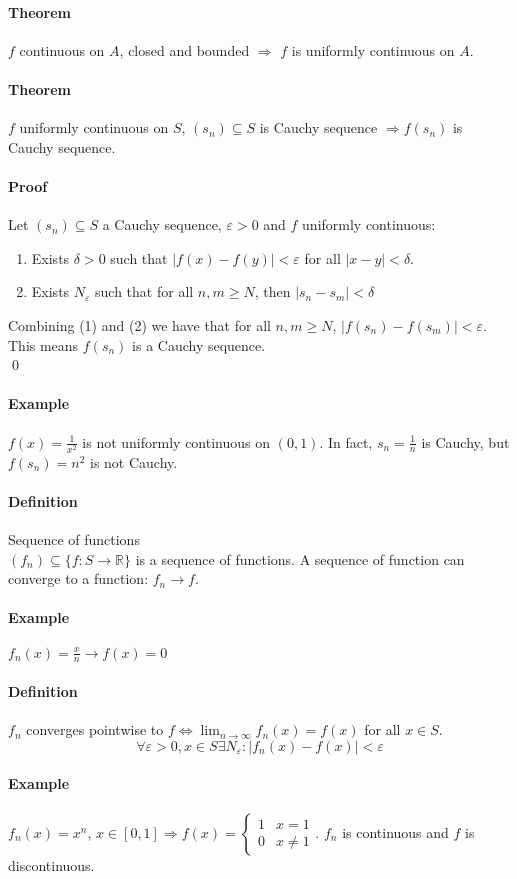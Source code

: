 \documentclass{article}
\newcommand{\DS}{\displaystyle}
\newcommand{\abs}[1]{\left|#1\right|}
\newcommand{\func}[3]{#1 : #2 \rightarrow #3}
\newcommand{\limn}{\lim_{n \to \infty}}
\newcommand{\intcc}[1]{\left[#1\right]}
\newcommand{\R}{\mathbb{R}}
\newcommand{\Ep}{\varepsilon}
\newcommand{\Def}{\paragraph{Definition}}
\newcommand{\Theorem}{\paragraph{Theorem}}
\newcommand{\Proof}{\paragraph{Proof}}
\newcommand{\Example}{\paragraph{Example}}
\begin{document}
	\Theorem $f$ continuous on $A$, closed and bounded $\Rightarrow$ $f$ is
	uniformly continuous on $A$.

	\Theorem $f$ uniformly continuous on $S$, $(s_n) \subseteq S$ is Cauchy
	sequence $\Rightarrow f(s_n)$ is Cauchy sequence.

	\Proof Let $(s_n) \subseteq S$ a Cauchy sequence, $\Ep > 0$ and $f$ uniformly
	continuous:
\begin{enumerate}
	\item Exists $\delta > 0$ such that $\abs{f(x)-f(y)} < \Ep$ for all $\abs{x-y}
	< \delta$.
	\item Exists $N_\Ep$ such that for all $n,m \geq N$, then $\abs{s_n - s_m} <
	\delta$
\end{enumerate}
	Combining (1) and (2) we have that for all $n,m \geq N$, $\abs{f(s_n)-f(s_m)}
	< \Ep$. This means $f(s_n)$ is a Cauchy sequence.
\\\qed

	\Example $f(x) = \frac{1}{x^2}$ is not uniformly continuous on $(0,1)$. In
	fact, $s_n = \frac{1}{n}$ is Cauchy, but $f(s_n) = n^2$ is not Cauchy.

	\Def Sequence of functions
\\$(f_n) \subseteq \{ \func{f}{S}{\R} \}$ is a sequence of functions. A sequence
	of function can converge to a function: $f_n \to f$.

	\Example $f_n(x) = \frac{x}{n} \to f(x) = 0$

	\Def $f_n$ converges pointwise to $f \iff \DS \limn{f_n(x)} = f(x)$ for all
	$x \in S$.
\begin{equation*}
	\forall \Ep > 0, x \in S \exists N_\Ep : \abs{f_n(x) - f(x)} < \Ep
\end{equation*}

	\Example $f_n(x) = x^n$, $x \in \intcc{0,1} \Rightarrow f(x) =
	\begin{cases}1 & x = 1 \\ 0 & x \neq 1\end{cases}$. $f_n$ is continuous and
	$f$ is discontinuous.
\end{document}
